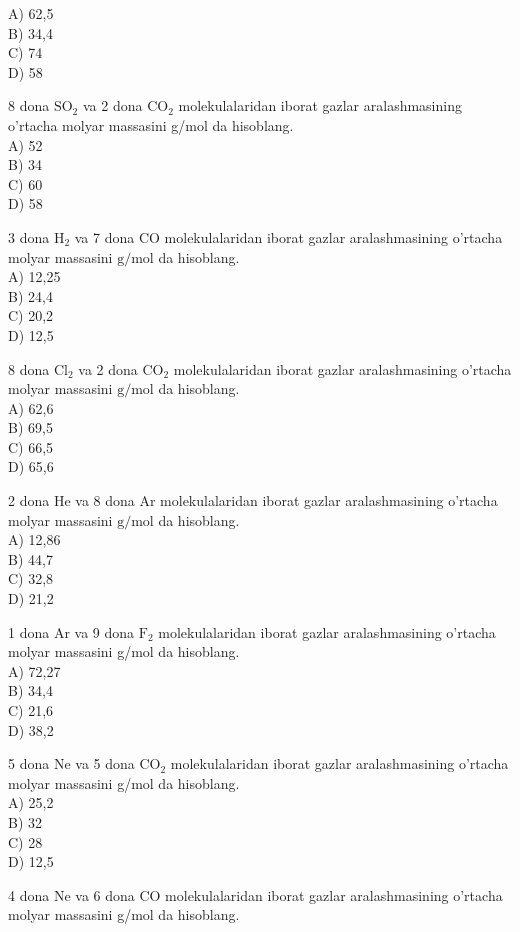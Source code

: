 A) 62,5\\
B) 34,4\\
C) 74\\
D) 58
  \item 8 dona $\mathrm{SO}_{2}$ va 2 dona $\mathrm{CO}_{2}$ molekulalaridan iborat gazlar aralashmasining o'rtacha molyar massasini g/mol da hisoblang.\\
A) 52\\
B) 34\\
C) 60\\
D) 58
  \item 3 dona $\mathrm{H}_{2}$ va 7 dona CO molekulalaridan iborat gazlar aralashmasining o'rtacha molyar massasini $\mathrm{g} / \mathrm{mol}$ da hisoblang.\\
A) 12,25\\
B) 24,4\\
C) 20,2\\
D) 12,5
  \item 8 dona $\mathrm{Cl}_{2}$ va 2 dona $\mathrm{CO}_{2}$ molekulalaridan iborat gazlar aralashmasining o'rtacha molyar massasini $\mathrm{g} / \mathrm{mol}$ da hisoblang.\\
A) 62,6\\
B) 69,5\\
C) 66,5\\
D) 65,6
  \item 2 dona He va 8 dona Ar molekulalaridan iborat gazlar aralashmasining o'rtacha molyar massasini $\mathrm{g} / \mathrm{mol}$ da hisoblang.\\
A) 12,86\\
B) 44,7\\
C) 32,8\\
D) 21,2
  \item 1 dona Ar va 9 dona $\mathrm{F}_{2}$ molekulalaridan iborat gazlar aralashmasining o'rtacha molyar massasini g/mol da hisoblang.\\
A) 72,27\\
B) 34,4\\
C) 21,6\\
D) 38,2
  \item 5 dona Ne va 5 dona $\mathrm{CO}_{2}$ molekulalaridan iborat gazlar aralashmasining o'rtacha molyar massasini g/mol da hisoblang.\\
A) 25,2\\
B) 32\\
C) 28\\
D) 12,5
  \item 4 dona Ne va 6 dona CO molekulalaridan iborat gazlar aralashmasining o'rtacha molyar massasini g/mol da hisoblang.\\
